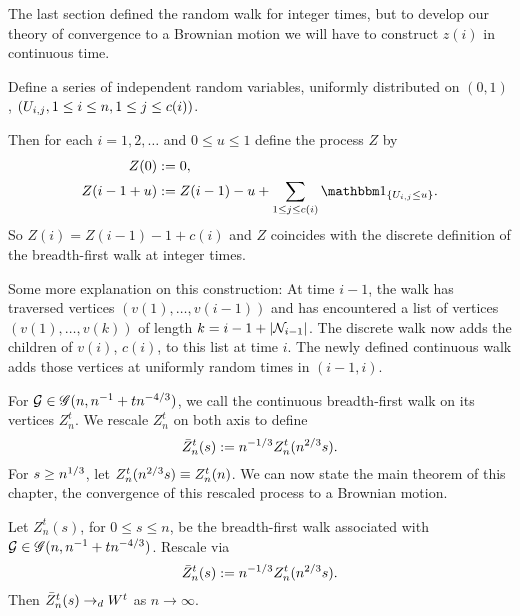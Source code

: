 The last section defined the random walk for integer times,
but to develop our theory of convergence to a Brownian motion
we will have to construct $z(i)$ in continuous time.

Define a series of independent random variables, 
uniformly distributed on $(0,1)$, 
$(U_{i,j}, 1 \leq i \leq n, 1 \leq j \leq c(i))$.

Then for each $i = 1, 2, \dots$ and $0 \leq u \leq 1$ define the process $Z$ by
\begin{equation} \label{E: def Z}
\begin{aligned}
Z(0) &:= 0, \\
Z(i - 1 + u) &:= Z(i-1) - u + \sum_{1 \leq j \leq c(i)} \Ind{\{ \Uij \leq u \}}.
\end{aligned}
\end{equation}
So $Z(i) = Z(i-1) - 1 + c(i)$ 
and $Z$ coincides with the discrete definition of the breadth-first walk at integer times.

Some more explanation on this construction:
At time $i-1$, 
the walk has traversed vertices
$(v(1), \dots, v(i-1))$
and has encountered a list of vertices
$(v(1), \dots, v(k))$
of length
$k = i-1 + |\mathcal{N}_{i-1}|$.
The discrete walk now adds the children of $v(i)$,
$c(i)$, to this list at time $i$.
The newly defined continuous walk adds those vertices at uniformly random times in $(i-1, i)$.


For $\mathcal{G} \in \mathscr{G}(n, n^{-1} + tn^{-4/3})$, 
we call the continuous breadth-first walk on its vertices $Z_n^t$.
We rescale $Z_n^t$ on both axis to define
\begin{equation} \label{E: def Zbar}
\bar{Z}^t_n(s) := n^{-1 / 3} Z_n^t(n^{2 / 3}s).
\end{equation}
For $s \geq n^{1 / 3}$, 
let $Z_n^t(n^{2 / 3}s) \equiv Z_n^t(n)$.
We can now state the main theorem of this chapter,
the convergence of this rescaled process to a Brownian motion.

\begin{theorem} \label{T: Z -> W}
	Let $Z_n^t(s)$, for $0 \leq s \leq n$, 
	be the breadth-first walk associated with $\mathcal{G} \in \mathscr{G}(n, n^{-1} + tn^{-4/3})$.
	Rescale via
	\begin{equation*}
	\bar{Z}^t_n(s) := n^{-1 / 3} Z_n^t(n^{2 / 3}s).
	\end{equation*}
	Then $\bar{Z}^t_n(s) \rightarrow_d W^t$ as $n \rightarrow \infty$.
\end{theorem}

